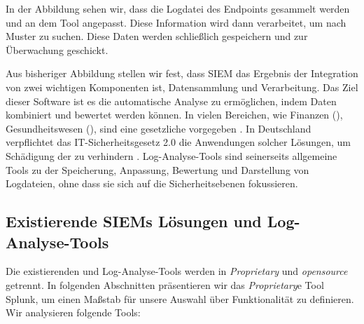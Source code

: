 In der Abbildung sehen wir, dass die Logdatei des \gls{Endpoint}s gesammelt werden und an dem Tool angepasst. Diese Information wird dann verarbeitet, um nach Muster zu suchen. Diese Daten werden schließlich gespeichern und zur Überwachung geschickt.





Aus bisheriger Abbildung stellen wir fest, dass \gls{SIEM} das Ergebnis der Integration von zwei wichtigen Komponenten ist, Datensammlung und Verarbeitung. Das Ziel dieser Software ist es die automatische Analyse zu ermöglichen, indem Daten kombiniert und bewertet werden können. In vielen Bereichen, wie Finanzen (), Gesundheitswesen (), sind  eine gesetzliche vorgegeben \citep{Jog_SIEM}. In Deutschland verpflichtet das \gls{IT-Sicherheitsgesetz 2.0} die Anwendungen solcher Lösungen, um Schädigung der  zu verhindern \citep{BSI_ITSG}. Log-Analyse-Tools sind seinerseits allgemeine Tools zu der Speicherung, Anpassung, Bewertung und Darstellung von Logdateien, ohne dass sie sich auf die Sicherheitsebenen fokussieren.


\subsection{Existierende SIEMs Lösungen und Log-Analyse-Tools}
Die existierenden  und Log-Analyse-Tools werden in \textit{\gls{Proprietary}} und \textit{\gls{opensource}} getrennt. In folgenden Abschnitten präsentieren wir das \textit{\gls{Proprietary}}e Tool Splunk, um einen Maßstab für unsere Auswahl über Funktionalität zu definieren. Wir analysieren folgende Tools: %

